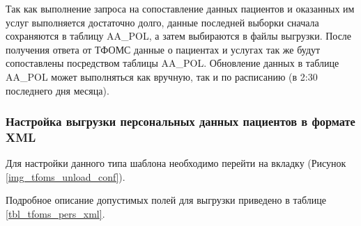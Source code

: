 Так как выполнение запроса на сопоставление данных пациентов и оказанных им услуг выполняется достаточно долго, данные последней выборки сначала сохраняются в таблицу AA\_POL, а затем выбираются в файлы выгрузки. После получения ответа от ТФОМС данные о пациентах и услугах так же будут сопоставлены посредством таблицы AA\_POL. Обновление данных в таблице AA\_POL может выполняться как вручную, так и по расписанию (в 2:30 последнего дня месяца).

\subsubsection{Настройка выгрузки персональных данных пациентов в формате XML}

Для настройки данного типа шаблона необходимо перейти на вкладку  (Рисунок \ref{img_tfoms_unload_conf}).

Подробное описание допустимых полей для выгрузки приведено в таблице \ref{tbl_tfoms_pers_xml}.

